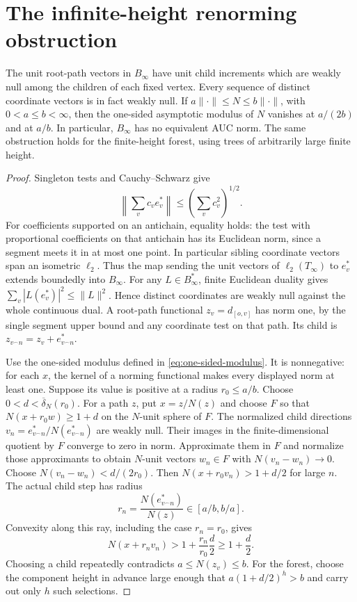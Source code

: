 \section{The infinite-height renorming obstruction}\label{sec:infinite-obstruction}
\begin{proposition}\label{binf:obstruction}
The unit root-path vectors in $B_\infty$ have unit child increments
which are weakly null among the children of each fixed vertex. Every
sequence of distinct coordinate vectors is in fact weakly null.
If $a\|\cdot\|\le N\le b\|\cdot\|$, with $0<a\le b<\infty$,
then the one-sided asymptotic modulus of $N$ vanishes at $a/(2b)$
and at $a/b$. In particular, $B_\infty$ has no equivalent AUC norm.
The same obstruction holds for the finite-height forest, using trees
of arbitrarily large finite height.
\end{proposition}
\begin{proof}
Singleton tests and Cauchy--Schwarz give
\[
 \left\|\sum_v c_v e_v^*\right\|\le
 \left(\sum_v c_v^2\right)^{1/2}.
\]
For coefficients supported on an antichain, equality holds: the test
with proportional coefficients on that antichain has its Euclidean
norm, since a segment meets it in at most one point. In particular
sibling coordinate vectors span an isometric $\ell_2$.
Thus the map sending the unit vectors of $\ell_2(T_\infty)$ to
$e_v^*$ extends boundedly into $B_\infty$. For any $L\in B_\infty^*$,
finite Euclidean duality gives
$\sum_v|L(e_v^*)|^2\le\|L\|^2$. Hence distinct coordinates are
weakly null against the whole continuous dual. A root-path functional
$z_v=d_{[o,v]}$ has norm one, by the single segment upper bound and
any coordinate test on that path. Its child is
$z_{v^\frown n}=z_v+e_{v^\frown n}^*$.

Use the one-sided modulus defined in \eqref{eq:one-sided-modulus}.
It is nonnegative: for each $x$, the kernel of a norming functional
makes every displayed norm at least one. Suppose its value is positive
at a radius $r_0\le a/b$. Choose $0<d<\overline\delta_N(r_0)$.
For a path $z$, put $x=z/N(z)$ and choose $F$ so that
$N(x+r_0w)\ge1+d$ on the $N$-unit sphere of $F$. The normalized
child directions $v_n=e_{v^\frown n}^*/N(e_{v^\frown n}^*)$ are
weakly null. Their images in the finite-dimensional quotient by $F$
converge to zero in norm. Approximate them in $F$ and normalize those
approximants to obtain $N$-unit vectors $w_n\in F$ with
$N(v_n-w_n)\to0$. Choose $N(v_n-w_n)<d/(2r_0)$. Then
$N(x+r_0v_n)>1+d/2$ for large $n$. The actual child step has radius
\[
 r_n=\frac{N(e_{v^\frown n}^*)}{N(z)}\in[a/b,b/a].
\]
Convexity along this ray, including the case $r_n=r_0$, gives
\begin{equation}\label{binf:radial-growth}
 N(x+r_nv_n)>1+\frac{r_n}{r_0}\frac d2\ge1+\frac d2.
\end{equation}
Choosing a child repeatedly contradicts $a\le N(z_v)\le b$.
For the forest, choose the component height in advance large enough
that $a(1+d/2)^h>b$ and carry out only $h$ such selections.

\end{proof}


